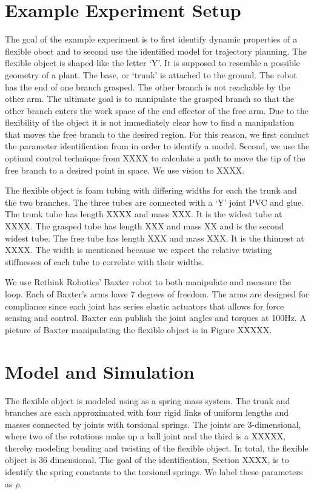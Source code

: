 \documentclass[runningheads,a4paper]{llncs}
\begin{document}
\section{Example Experiment Setup}
The goal of the example experiment is to first identify dynamic properties of a flexible obect and to second use the identified model for trajectory planning. The flexible object is shaped like the letter `Y'.  It is supposed to resemble a possible geometry of a plant. The base, or `trunk' is attached to the ground. The robot has the end of one branch grasped.  The other branch is not reachable by the other arm. The ultimate goal is to manipulate the grasped branch so that the other branch enters the work space of the end effector of the free arm. Due to the flexibility of the object it is not immediately clear how to find a manipulation that moves the free branch to the desired region. For this reason, we first conduct the parameter identification from \cite{caldwell_coleman_correll_iros} in order to identify a model.  Second, we use the optimal control technique from XXXX to calculate a path to move the tip of the free branch to a desired point in space.  We use vision to XXXX.

The flexible object is foam tubing with differing widths for each the trunk and the two branches. The three tubes are connected with a `Y' joint PVC and glue.  The trunk tube has length XXXX and mass XXX. It is the widest tube at XXXX. The grasped tube has length XXX and mass XX and is the second widest tube. The free tube has length XXX and mass XXX. It is the thinnest at XXXX.  The width is mentioned because we expect the relative twisting stiffnesses of each tube to correlate with their widths. 

We use Rethink Robotics' Baxter \cite{guizzo2011rethink} robot to both manipulate and measure the loop.  Each of Baxter's arms have 7 degrees of freedom.  The arms are designed for compliance since each joint has series elastic actuators that allows for force sensing and control.  Baxter can publish the joint angles and torques at 100Hz.  A picture of Baxter manipulating the flexible object is in Figure XXXXX. 

\section{Model and Simulation}
The flexible object is modeled using as a spring mass system. The trunk and branches are each approximated with four rigid links of uniform lengths and masses connected by joints with torsional springs. The joints are 3-dimensional, where two of the rotations make up a ball joint and the third is a XXXXX, thereby modeling bending and twisting of the flexible object. In total, the flexible object is 36 dimensional. The goal of the identification, Section XXXX, is to identify the spring constants to the torsional springs. We label these parameters as $\rho$.
\end{document}

